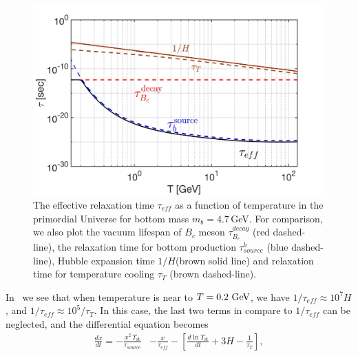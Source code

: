 \begin{figure} 
\centerline{\includegraphics[width=0.9\linewidth]{./plots/Tau_RelaxationTime002}}
\caption{The effective relaxation time $\tau_{eff}$ as a function of temperature in the primordial Universe for bottom mass $m_b=4.7$\,GeV. For comparison, we also plot the vacuum lifespan of $B_c$ meson $\tau_{B_c}^{decay}$ (red dashed-line), the relaxation time for bottom production $\tau^b_{source}$ (blue dashed-line), Hubble expansion time $1/H$(brown solid line) and relaxation time for temperature cooling $\tau_T$ (brown dashed-line). }
\label{RelaxationTime_eff}
\end{figure}

In~ we see that when temperature is near to $T=0.2\text{ GeV}$, we have $1/\tau_{eff}\approx10^{7}H$, and $1/\tau_{eff}\approx10^5/\tau_T$. In this case, the last two terms in  compare to $1/\tau_{eff}$ can be neglected, and the differential equation becomes
\begin{align}\label{nonstationary_eq}
\frac{dx}{dt}=-\frac{x^2\,\Upsilon_\mathrm{st}}{\tau_{source}}&-\frac{x}{\tau_{eff}}-\left[\frac{d\ln\Upsilon_\mathrm{st}}{dt}+3H-\frac{1}{\tau_T}\right],
\end{align}

